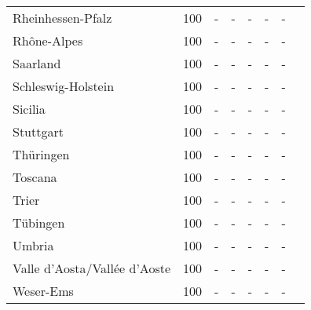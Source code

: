 \begin{table}[H]
\begin{tabularx}{\textwidth}{Xccccccc}
            Rheinhessen-Pfalz & 100 & - & - & - & - & - \\
            Rhône-Alpes & 100 & - & - & - & - & - \\
            Saarland & 100 & - & - & - & - & - \\
            Schleswig-Holstein & 100 & - & - & - & - & - \\
            Sicilia & 100 & - & - & - & - & - \\
            Stuttgart & 100 & - & - & - & - & - \\
            Thüringen & 100 & - & - & - & - & - \\
            Toscana & 100 & - & - & - & - & - \\
            Trier & 100 & - & - & - & - & - \\
            Tübingen & 100 & - & - & - & - & - \\
            Umbria & 100 & - & - & - & - & - \\
            Valle d’Aosta/Vallée d’Aoste & 100 & - & - & - & - & - \\
            Weser-Ems & 100 & - & - & - & - & - \\
        \bottomrule
    \end{tabularx}
\end{table}
    